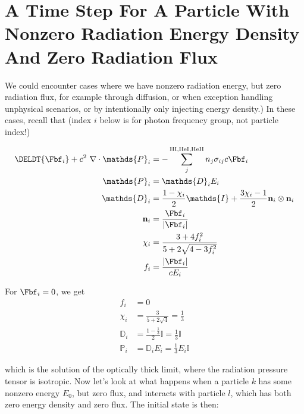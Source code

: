 \chapter{A Time Step For A Particle With Nonzero Radiation Energy Density And Zero Radiation Flux}
\label{app:zero-flux-nonzero-energy}

We could encounter cases where we have nonzero radiation energy, but zero radiation flux, for
example through diffusion, or when exception handling unphysical scenarios, or by intentionally only
injecting energy density.) In these cases, recall that (index $i$ below is for photon
frequency group, not particle index!)

\begin{align}
	\DELDT{\Fbf_i} + c^2 \ \nabla \cdot \mathds{P}_i &=
		- \sum\limits_{j}^{\mathrm{HI, HeI, HeII}} n_j \sigma_{i j} c \Fbf_i \\
	\mathds{P}_i &=
		\mathds{D}_i E_i \\
	\mathds{D}_i &=
		\frac{1- \chi_i}{2} \mathds{I} + \frac{3 \chi_i - 1}{2} \mathbf{n}_i \otimes \mathbf{n}_i\\
	\mathbf{n}_i &=
		\frac{\Fbf_i}{|\Fbf_i|} \\
	\chi_i &=
		\frac{3 + 4 f_i ^2}{5 + 2 \sqrt{4 - 3 f_i^2}} \\
	f_i &=
		\frac{|\Fbf_i|}{c E_i}
\end{align}

For $\Fbf_i = 0$, we get
\begin{align}
	f_i &= 0 \\
	\chi_i &= \frac{3}{5 + 2 \sqrt{4}} = \frac{1}{3} \\
	\mathds{D}_i &= \frac{1- \frac{1}{3}}{2} \mathds{I} = \frac{1}{3} \mathds{I} \\
	\mathds{P}_i &= \mathds{D}_i E_i =  \frac{1}{3} E_i \mathds{I}
\end{align}

which is the solution of the optically thick limit, where the radiation pressure tensor is
isotropic.
Now let's look at what happens when a particle $k$ has some nonzero energy $E_0$, but zero flux,
and interacts with particle $l$, which has both zero energy density and zero flux. The initial
state is then:

